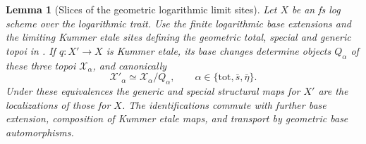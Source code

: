 \documentclass[11pt]{article}
\newtheorem{lemma}[theorem]{Lemma}
\theoremstyle{definition}
\theoremstyle{remark}
\begin{document}
\begin{lemma}[Slices of the geometric logarithmic limit sites]
\label{lem:frag-log-limit-slices}
Let $X$ be an fs log scheme over the logarithmic trait.  Use the
finite logarithmic base extensions and the limiting Kummer etale
sites defining the geometric total, special and generic topoi
in \cite[\S8.2, (8.2.1)]{FujiwaraKatoNakayama}.
If $q:X'\to X$ is Kummer etale, its base changes determine objects
$Q_\alpha$ of these three topoi $\mathcal X_\alpha$, and canonically
\[
 \mathcal X'_\alpha\simeq\mathcal X_\alpha/Q_\alpha,
 \qquad \alpha\in\{\mathrm{tot},\bar s,\bar\eta\}.
\]
Under these equivalences the generic and special structural maps
for $X'$ are the localizations of those for $X$.
The identifications commute with further base extension, composition
of Kummer etale maps, and transport by geometric base automorphisms.
\end{lemma}
\end{document}
